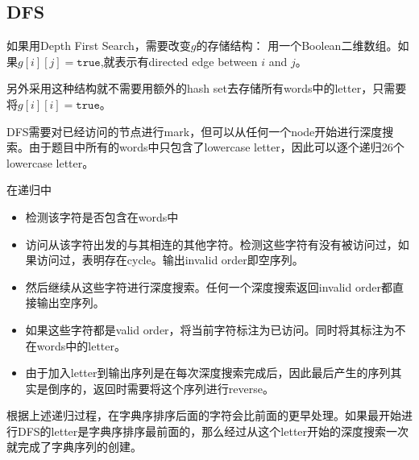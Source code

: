 \subsection{DFS}
如果用Depth First Search，需要改变$g$的存储结构： 用一个Boolean二维数组。如果$g[i][j]=\texttt{true}$,就表示有directed edge between $i$ and $j$。
\par
另外采用这种结构就不需要用额外的hash set去存储所有words中的letter，只需要将$g[i][i]=\texttt{true}$。
\par
DFS需要对已经访问的节点进行mark，但可以从任何一个node开始进行深度搜索。由于题目中所有的words中只包含了lowercase letter，因此可以逐个递归26个lowercase letter。
\par
在递归中
\begin{itemize}
\item 检测该字符是否包含在words中
\item 访问从该字符出发的与其相连的其他字符。检测这些字符有没有被访问过，如果访问过，表明存在cycle。输出invalid order即空序列。
\item 然后继续从这些字符进行深度搜索。任何一个深度搜索返回invalid order都直接输出空序列。
\item 如果这些字符都是valid order，将当前字符标注为已访问。同时将其标注为不在words中的letter。
\item 由于加入letter到输出序列是在每次深度搜索完成后，因此最后产生的序列其实是倒序的，返回时需要将这个序列进行reverse。
\end{itemize}
根据上述递归过程，在字典序排序后面的字符会比前面的更早处理。如果最开始进行DFS的letter是字典序排序最前面的，那么经过从这个letter开始的深度搜索一次就完成了字典序列的创建。
\setcounter{lstlisting}{0}
